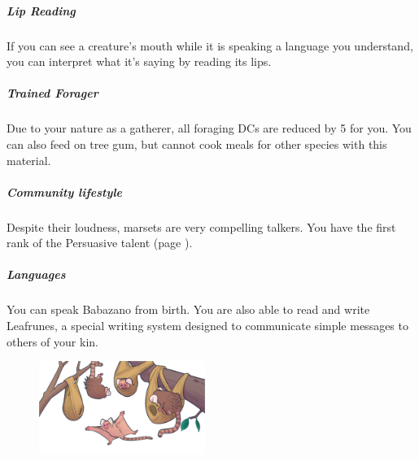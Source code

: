 \begin{linenumbers}
\subparagraph{Lip Reading} If you can see a creature's mouth while it is speaking a language you understand, you can interpret what it's saying by reading its lips.

\subparagraph{Trained Forager} Due to your nature as a gatherer, all foraging DCs are reduced by 5 for you.
You can also feed on tree gum, but cannot cook meals for other species with this material.

\subparagraph{Community lifestyle} Despite their loudness, marsets are very compelling talkers.
You have the first rank of the Persuasive talent (page \pageref{tal::persuasive}).

\subparagraph{Languages} You can speak Babazano from birth.
You are also able to read and write Leafrunes, a special writing system designed to communicate simple messages to others of your kin.

\begin{figure}[!b]
    \centering
    \includegraphics[width=0.48\textwidth]{02kins/img/13marset_colony.png}
\end{figure}
\end{linenumbers}

